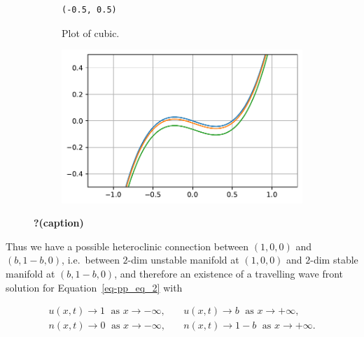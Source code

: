 \documentclass[
  letterpaper,
  DIV=11,
  numbers=noendperiod]{scrreprt}
\theoremstyle{plain}
\theoremstyle{definition}
\theoremstyle{plain}
\theoremstyle{remark}
\begin{document}
\begin{figure}
{\begin{figure}

{\centering 

\begin{verbatim}
(-0.5, 0.5)
\end{verbatim}

}

\caption{Plot of cubic.}

\end{figure}

\begin{figure}[H]

{\centering \includegraphics{LotkaVolteraPDE_files/figure-pdf/fig-cubic-output-2.pdf}

}

\end{figure}

}

\caption{\label{fig-cubic}\textbf{?(caption)}}

\end{figure}

Thus we have a possible heteroclinic connection between \((1,0,0)\) and
\((b, 1-b, 0)\), i.e.~between \(2\)-dim unstable manifold at \((1,0,0)\)
and \(2\)-dim stable manifold at \((b, 1-b, 0)\), and therefore an
existence of a travelling wave front solution for
Equation~\ref{eq-pp_eq_2} with

\[
\begin{aligned}
u(x,t) \to 1 \; \text{ as } x \to - \infty,  \quad & u(x,t) \to b \; \text{ as } x \to +\infty,  \\
n(x,t) \to 0 \;  \text{ as } x \to - \infty ,  \quad & n(x,t) \to 1-b \; \text{ as } x \to +\infty.
\end{aligned}
\]
\end{document}
